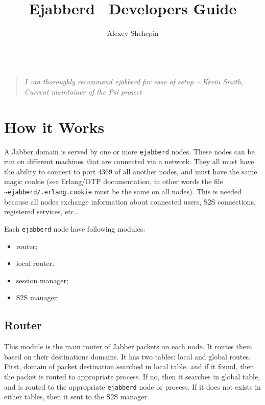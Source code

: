 \documentclass[a4paper,10pt]{article}
\title{Ejabberd \version\ Developers Guide}
\author{Alexey Shchepin \\
  \ahrefurl{mailto:alexey@sevcom.net} \\
  \ahrefurl{xmpp:aleksey@jabber.ru}}
\newcommand{\logoscale}{0.7}
\newcommand{\insscaleimg}[2]{
  \imgsrc{#2}{}
  \begin{latexonly}
    \scalebox{#1}{\texttt{[image: \#2]}}
  \end{latexonly}
}
\newcommand{\ejabberd}{\texttt{ejabberd}}
\newcommand{\Jabber}{Jabber}
\begin{document}
\label{titlepage}
\begin{titlepage}
  \maketitle{}

  \begin{center}
  {\insscaleimg{\logoscale}{logo.png}
    \par
  }
  \end{center}

  \begin{quotation}\textit{I can thoroughly recommend ejabberd for ease of setup --
  Kevin Smith, Current maintainer of the Psi project}\end{quotation}

\end{titlepage}

\tableofcontents{}



\section{How it Works}
\label{howitworks}


A \Jabber{} domain is served by one or more \ejabberd{} nodes.  These nodes can
be run on different machines that are connected via a network.  They all must
have the ability to connect to port 4369 of all another nodes, and must have
the same magic cookie (see Erlang/OTP documentation, in other words the file
\texttt{\~{}ejabberd/.erlang.cookie} must be the same on all nodes). This is
needed because all nodes exchange information about connected users, S2S
connections, registered services, etc\ldots



Each \ejabberd{} node have following modules:
\begin{itemize}
\item router;
\item local router.
\item session manager;
\item S2S manager;
\end{itemize}


\subsection{Router}

This module is the main router of \Jabber{} packets on each node.  It routes
them based on their destinations domains.  It has two tables: local and global
routes.  First, domain of packet destination searched in local table, and if it
found, then the packet is routed to appropriate process.  If no, then it
searches in global table, and is routed to the appropriate \ejabberd{} node or
process.  If it does not exists in either tables, then it sent to the S2S
manager.
\end{document}
